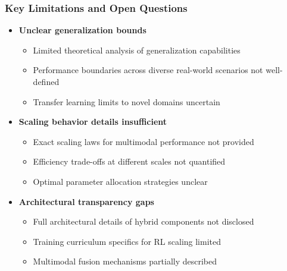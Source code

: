 \begin{frame}

\frametitle{Key Limitations and Open Questions}

\begin{itemize}
    \item \textbf{Unclear generalization bounds}
    \begin{itemize}
        \item Limited theoretical analysis of generalization capabilities
        \item Performance boundaries across diverse real-world scenarios not well-defined
        \item Transfer learning limits to novel domains uncertain
    \end{itemize}
    
    \item \textbf{Scaling behavior details insufficient}
    \begin{itemize}
        \item Exact scaling laws for multimodal performance not provided
        \item Efficiency trade-offs at different scales not quantified
        \item Optimal parameter allocation strategies unclear
    \end{itemize}
    
    \item \textbf{Architectural transparency gaps}
    \begin{itemize}
        \item Full architectural details of hybrid components not disclosed
        \item Training curriculum specifics for RL scaling limited
        \item Multimodal fusion mechanisms partially described
    \end{itemize}
\end{itemize}
\end{frame}%

